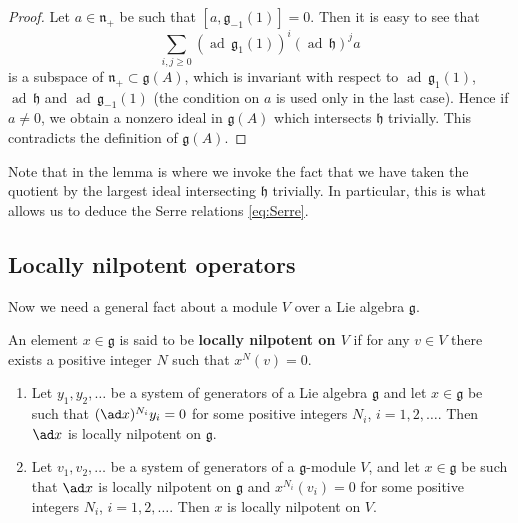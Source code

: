 \documentclass[12pt]{article}
\begin{document}
\begin{proof}
    Let $a \in \mathfrak{n}_+$ be such that $[a, \mathfrak{g}_{-1}(1)] = 0$.
    Then it is easy to see that
    \[
        \sum_{i,j \geq 0} (\operatorname{ad}\,\mathfrak{g}_1(1))^i
        (\operatorname{ad}\,\mathfrak{h})^j a
    \]
    is a subspace of $\mathfrak{n}_+ \subset \mathfrak{g}(A)$, which is invariant with respect
    to $\operatorname{ad}\,\mathfrak{g}_1(1)$, $\operatorname{ad}\,\mathfrak{h}$ and
    $\operatorname{ad}\,\mathfrak{g}_{-1}(1)$ (the condition on $a$ is used only in the last case).
    Hence if $a \neq 0$, we obtain a nonzero ideal in $\mathfrak{g}(A)$ which intersects
    $\mathfrak{h}$ trivially. This contradicts the definition of $\mathfrak{g}(A)$.
\end{proof}
\begin{remark}
    Note that in the lemma is where we invoke the fact that we have taken the quotient by the largest ideal intersecting $\mathfrak{h}$ trivially. In particular, this is what allows us to deduce the Serre relations \eqref{eq:Serre}.
\end{remark}


\subsection{Locally nilpotent operators}
Now we need a general fact about a module $V$ over a Lie algebra $\mathfrak{g}$.
\begin{definition}
    An element $x\in\mathfrak{g}$ is said to be \textbf{locally nilpotent on $V$}
    if for any $v\in V$ there exists a positive integer $N$ such that $x^{N}(v)=0$.
\end{definition}

\begin{lemma}\label{lem:local-nilpotence}
    \leavevmode
    \begin{enumerate}[label=(\alph*)]
        \item Let $y_1,y_2,\dots$ be a system of generators of a Lie algebra $\mathfrak{g}$
              and let $x\in\mathfrak{g}$ be such that $(\ad x)^{N_i}y_i=0$ for some positive integers
              $N_i$, $i=1,2,\dots$. Then $\ad x$ is locally nilpotent on $\mathfrak{g}$.

        \item Let $v_1,v_2,\dots$ be a system of generators of a $\mathfrak{g}$-module $V$,
              and let $x\in\mathfrak{g}$ be such that $\ad x$ is locally nilpotent on $\mathfrak{g}$
              and $x^{N_i}(v_i)=0$ for some positive integers $N_i$, $i=1,2,\dots$.
              Then $x$ is locally nilpotent on $V$.
    \end{enumerate}
\end{lemma}
\end{document}
